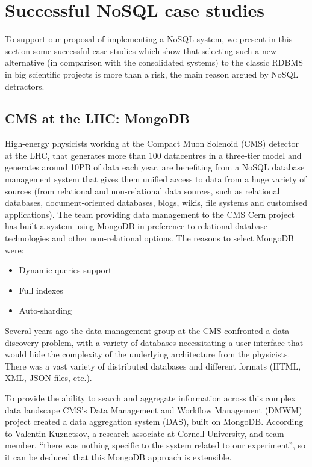 \chapter{Successful NoSQL case studies} %
\label{cha:successful_nosql_case_studies}

To support our proposal of implementing a NoSQL system, we present in this section some successful case studies which show that selecting such a new alternative (in comparison with the consolidated systems) to the classic RDBMS in big scientific projects is more than a risk, the main reason argued by NoSQL detractors.


\section{CMS at the LHC: MongoDB} %
\label{sec:cms_at_the_lhc_mongodb}
High-energy physicists working at the Compact Muon Solenoid (CMS) detector at the LHC, that generates more than 100 datacentres in a three-tier model and generates around 10PB of data each year, are benefiting from a NoSQL database management system that gives them unified access to data from a huge variety of sources (from relational and non-relational data sources, such as relational databases, document-oriented databases, blogs, wikis, file systems and customised applications). The team providing data management to the CMS Cern project has built a system using MongoDB in preference to relational database technologies and other non-relational options. The reasons to select MongoDB were:

\begin{itemize}
\item Dynamic queries support
\item Full indexes
\item Auto-sharding
\end{itemize}

Several years ago the data management group at the CMS confronted a data discovery problem, with a variety of databases necessitating a user interface that would hide the complexity of the underlying architecture from the physicists. There was a vast variety of distributed databases and different formats (HTML, XML, JSON files, etc.).

To provide the ability to search and aggregate information across this complex data landscape CMS's Data Management and Workflow Management (DMWM) project created a data aggregation system (DAS), built on MongoDB.  According to Valentin Kuznetsov, a research associate at Cornell University, and team member, ``there was nothing specific to the system related to our experiment'', so it can be deduced that this MongoDB approach is extensible. 

